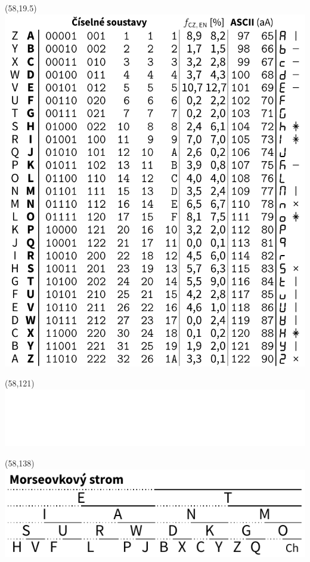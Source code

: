 \documentclass{extarticle}
\begin{document}
\begin{textblock}{0}(58,19.5)%
\vfill
{\includegraphics[scale=0.7]{tools/numbers-table.pdf}}
\vfill
\end{textblock}

\begin{textblock}{0}(58,121)%
  \vfill
  {\includegraphics[scale=0.7]{tools/czech.pdf}}
  \vfill
  \end{textblock}

\begin{textblock}{0}(58,138)%
\vfill
{\includegraphics[scale=0.7]{tools/morse-tree.pdf}}
\vfill
\end{textblock}
\end{document}
